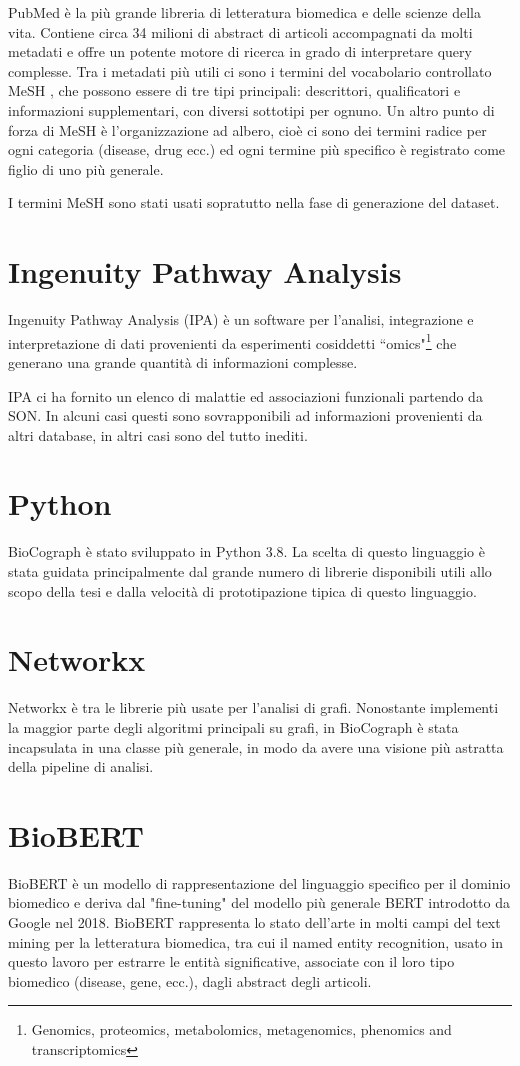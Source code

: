 \documentclass[12pt]{report}
\newcommand{\quotes}[1]{``#1"}
\begin{document}
PubMed \cite{pubmed} è la più grande libreria di letteratura biomedica e delle scienze della vita. Contiene circa 34 milioni di abstract di articoli accompagnati da molti metadati e offre un potente motore di ricerca in grado di interpretare query complesse. Tra i metadati più utili ci sono i termini del vocabolario controllato MeSH \cite{mesh}, che possono essere di tre tipi principali: descrittori, qualificatori e informazioni supplementari, con diversi sottotipi per ognuno. Un altro punto di forza di MeSH è l'organizzazione ad albero, cioè ci sono dei termini radice per ogni categoria (disease, drug ecc.) ed ogni termine più specifico è registrato come figlio di uno più generale.

I termini MeSH sono stati usati sopratutto nella fase di generazione del dataset.

\section{Ingenuity Pathway Analysis}
Ingenuity Pathway Analysis (IPA) è un software per l'analisi, integrazione e interpretazione di dati provenienti da esperimenti cosiddetti \quotes{omics}\footnote{Genomics, proteomics, metabolomics, metagenomics, phenomics and transcriptomics} che generano una grande quantità di informazioni complesse.

IPA ci ha fornito un elenco di malattie ed associazioni funzionali partendo da SON. In alcuni casi questi sono sovrapponibili ad informazioni provenienti da altri database, in altri casi sono del tutto inediti.

\section{Python}
BioCograph è stato sviluppato in Python 3.8. La scelta di questo linguaggio è stata guidata principalmente dal grande numero di librerie disponibili utili allo scopo della tesi e dalla velocità di prototipazione tipica di questo linguaggio.

\section{Networkx}
Networkx è tra le librerie più usate per l'analisi di grafi. Nonostante implementi la maggior parte degli algoritmi principali su grafi, in BioCograph è stata incapsulata in una classe più generale, in modo da avere una visione più astratta della pipeline di analisi.

\section{BioBERT}
BioBERT \cite{lee2020biobert} è un modello di rappresentazione del linguaggio specifico per il dominio biomedico e deriva dal "fine-tuning" del modello più generale BERT \cite{bert} introdotto da Google nel 2018. BioBERT rappresenta lo stato dell'arte in molti campi del text mining per la letteratura biomedica, tra cui il named entity recognition, usato in questo lavoro per estrarre le entità significative,  associate con il loro tipo biomedico (disease, gene, ecc.), dagli abstract degli articoli.
\end{document}
